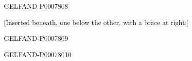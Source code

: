 \begin{GelfandAdjacentEvidence}{GELFAND-P000780}{8}


[Inserted beneath, one below the other, with a brace at right:]
\end{GelfandAdjacentEvidence}
\begin{GelfandAdjacentEvidence}{GELFAND-P000780}{9}

\end{GelfandAdjacentEvidence}
\begin{GelfandAdjacentEvidence}{GELFAND-P000780}{10}

\end{GelfandAdjacentEvidence}



